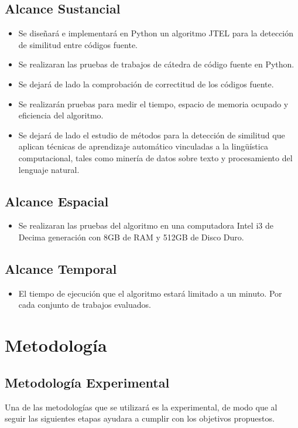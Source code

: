 \subsection{Alcance Sustancial}
\begin{itemize}
    \item Se diseñará e implementará en Python un algoritmo JTEL para la detección de similitud entre códigos fuente.
    \item Se realizaran las pruebas de trabajos de cátedra de código fuente en Python.
    \item Se dejará de lado la comprobación de correctitud de los códigos fuente.
    \item Se realizarán pruebas para medir el tiempo, espacio de memoria ocupado y eficiencia del algoritmo.
    \item Se dejará de lado el estudio de métodos para la detección de similitud que aplican técnicas de aprendizaje automático vinculadas a la lingüística computacional, tales como minería de datos sobre texto y procesamiento del lenguaje natural.
\end{itemize}
\subsection{Alcance Espacial}
\begin{itemize}
    \item Se realizaran las pruebas del algoritmo en una computadora Intel i3 de Decima generación con 8GB de RAM y 512GB de Disco Duro.
\end{itemize}
\subsection{Alcance Temporal}
\begin{itemize}
    \item El tiempo de ejecución que el algoritmo estará limitado a un minuto. Por cada conjunto de trabajos evaluados.
\end{itemize}
\section{Metodología}
\subsection{Metodología Experimental}
Una de las metodologías que se utilizará es la experimental, de modo que al seguir las siguientes etapas ayudara a cumplir con los objetivos propuestos.

